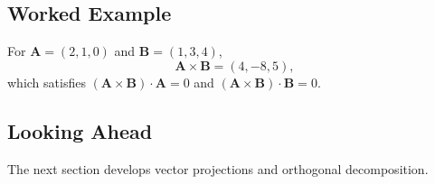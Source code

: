 \subsection{Worked Example}
For $\mathbf A=(2,1,0)$ and $\mathbf B=(1,3,4)$,
\[
\mathbf A\times\mathbf B=(4,-8,5),
\]
which satisfies $(\mathbf A\times\mathbf B)\cdot\mathbf A=0$ and
$(\mathbf A\times\mathbf B)\cdot\mathbf B=0$.

\subsection{Looking Ahead}
The next section develops vector projections and orthogonal decomposition.
